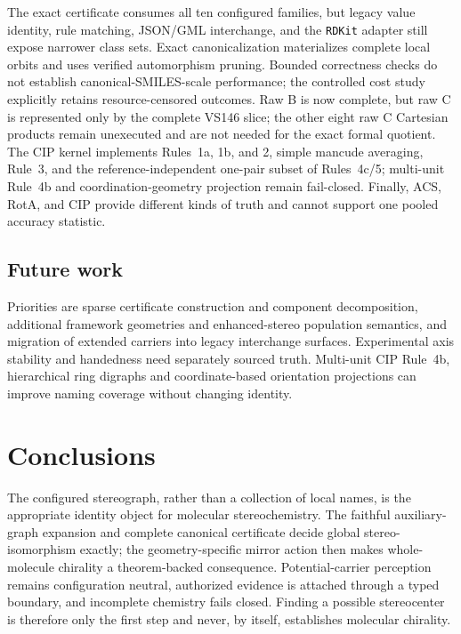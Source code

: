 \documentclass[pdflatex,sn-mathphys-num,referee,lineno]{sn-jnl}
\newcommand{\rdkit}{\texttt{RDKit}\xspace}
\theoremstyle{plain}
\theoremstyle{remark}
\theoremstyle{definition}
\begin{document}
The exact certificate consumes all ten configured families, but legacy
value identity, rule matching, JSON/GML interchange, and the \rdkit adapter
still expose narrower class sets. Exact canonicalization materializes complete
local orbits and uses verified automorphism pruning. Bounded correctness
checks do not establish canonical-SMILES-scale performance; the controlled
cost study explicitly retains resource-censored outcomes. Raw B is now
complete, but raw C is represented only by the complete VS146 slice; the
other eight raw C Cartesian products remain unexecuted and are not needed for
the exact formal quotient.  The CIP kernel implements
Rules~1a, 1b, and 2, simple mancude averaging, Rule~3, and the
reference-independent one-pair subset of Rules~4c/5; multi-unit Rule~4b and
coordination-geometry projection remain fail-closed.  Finally, ACS, RotA, and
CIP provide different kinds of truth and cannot support one pooled accuracy
statistic.

\subsection{Future work}

Priorities are sparse certificate construction and component decomposition,
additional framework geometries and enhanced-stereo population semantics,
and migration of extended carriers into legacy interchange surfaces.
Experimental axis stability and handedness need separately sourced truth.
Multi-unit CIP Rule~4b, hierarchical ring digraphs and coordinate-based
orientation projections can improve naming coverage without changing identity.

\section{Conclusions}

The configured stereograph, rather than a collection of local names, is the
appropriate identity object for molecular stereochemistry.  The faithful
auxiliary-graph expansion and complete canonical certificate decide global
stereo-isomorphism exactly; the geometry-specific mirror action then makes
whole-molecule chirality a theorem-backed consequence.  Potential-carrier
perception remains configuration neutral, authorized evidence is attached
through a typed boundary, and incomplete chemistry fails closed.  Finding a
possible stereocenter is therefore only the first step and never, by itself,
establishes molecular chirality.
\end{document}
